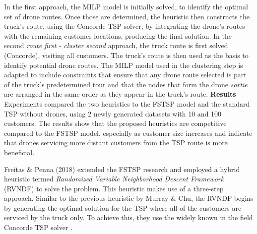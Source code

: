 \documentclass{article}
\begin{document}
	In the first approach, the MILP model is initially solved, to identify the optimal set of drone routes. Once those are determined, the heuristic then constructs the truck's route, using the Concorde TSP solver, by integrating the drone's routes with the remaining customer locations, producing the final solution. In the second \textit{route first - cluster second} approach, the truck route is first solved (Concorde), visiting all customers. The truck's route is then used as the basis to identify potential drone routes. The MILP model used in the clustering step is adapted to include constraints that ensure that any drone route selected is part of the truck's predetermined tour and that the nodes that form the drone \textit{sortie} are arranged in the same order as they appear in the truck's route. \textbf{Results} Experiments compared the two heuristics to the FSTSP model and the standard TSP without drones, using 2 newly generated datasets with 10 and 100 customers. The results show that the proposed heuristics are competitive compared to the FSTSP model, especially as customer size increases and indicate that drones servicing more distant customers from the TSP route is more beneficial.
	\par
	Freitas \& Penna (2018) \cite{DeFreitas2018} 
	extended the FSTSP research and employed a hybrid heuristic termed \textit{Randomized Variable Neighborhood Descent Framework} (RVNDF) to solve the problem. This heuristic makes use of a three-step approach. Similar to the previous heuristic by Murray \& Chu, the RVNDF begins by generating the optimal solution for the TSP where all of the customers are serviced by the truck only. To achieve this, they use the widely known in the field Concorde TSP solver \cite{ConcordeTSP}. 
\end{document}

